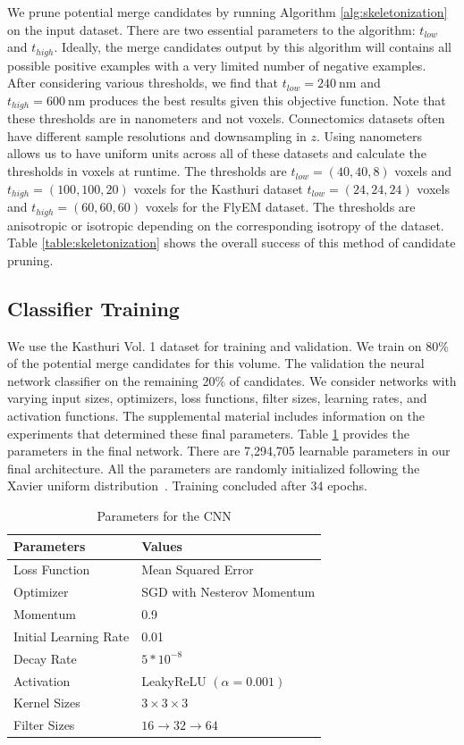 We prune potential merge candidates by running Algorithm \ref{alg:skeletonization} on the input dataset. 
There are two essential parameters to the algorithm: $t_{low}$ and $t_{high}$. 
Ideally, the merge candidates output by this algorithm will contains all possible positive examples with a very limited number of negative examples. 
After considering various thresholds, we find that $t_{low} = \SI{240}{\nano\meter}$ and $t_{high} = \SI{600}{\nano\meter}$ produces the best results given this objective function. 
Note that these thresholds are in nanometers and not voxels. 
Connectomics datasets often have different sample resolutions and downsampling in $z$. 
Using nanometers allows us to have uniform units across all of these datasets and calculate the thresholds in voxels at runtime. 
The thresholds are $t_{low} = (40, 40, 8)$ voxels and $t_{high} = (100, 100, 20)$ voxels for the Kasthuri dataset $t_{low} = (24, 24, 24)$ voxels and $t_{high} = (60, 60, 60)$ voxels for the FlyEM dataset.
The thresholds are anisotropic or isotropic depending on the corresponding isotropy of the dataset.
Table \ref{table:skeletonization} shows the overall success of this method of candidate pruning.

\subsection{Classifier Training}

We use the Kasthuri Vol. 1 dataset for training and validation. 
We train on 80\% of the potential merge candidates for this volume.
The validation the neural network classifier on the remaining 20\% of candidates. 
We consider networks with varying input sizes, optimizers, loss functions, filter sizes, learning rates, and activation functions. 
The supplemental material includes information on the experiments that determined these final parameters. 
Table \ref{table:architecture} provides the parameters in the final network.
There are 7,294,705 learnable parameters in our final architecture.
All the parameters are randomly initialized following the Xavier uniform distribution~\cite{glorot2010understanding}. 
Training concluded after 34 epochs. 

\begin{table}[h!]
	\centering
	\begin{tabular}{l l} \hline
		\textbf{Parameters} & \textbf{Values} \\ \hline
		Loss Function & Mean Squared Error \\
		Optimizer & SGD  with Nesterov Momentum \\
		Momentum & 0.9 \\
		Initial Learning Rate & 0.01 \\
		Decay Rate & $5 * 10^{-8}$ \\
		Activation & LeakyReLU $(\alpha = 0.001)$ \\
		Kernel Sizes & $3 \times 3 \times 3$ \\
		Filter Sizes & $16 \to 32 \to 64$ \\ \hline
	\end{tabular}
	\caption{Parameters for the CNN}
	\label{table:architecture}
\end{table}




